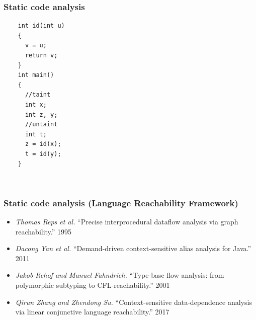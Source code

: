 \documentclass[xcolor=table]{beamer}
\begin{document}
\begin{frame}[fragile] \frametitle{Static code analysis}
  \begin{minipage}[t]{0.45\textwidth}
    \vspace{-7.5cm}
    \lstset{language=C,basicstyle=\small}
    \begin{lstlisting}
    int id(int u)
    {
      v = u;
      return v;
    }
    int main()
    {
      //taint
      int x;
      int z, y;
      //untaint
      int t;
      z = id(x);
      t = id(y);
    }
  \end{lstlisting}
\end{minipage}
~
\begin{minipage}[t]{0.45\textwidth}

\end{minipage}

\end{frame}

\begin{frame}
  \frametitle{Static code analysis (Language Reachability Framework)}
    \begin{itemize}
        \item \emph{Thomas Reps et al.} ``Precise interprocedural dataflow analysis via graph reachability.'' 1995
        \item \emph{Dacong Yan et al.} ``Demand-driven context-sensitive alias analysis for Java.'' 2011
        \item \emph{Jakob Rehof and Manuel Fahndrich.} ``Type-base flow analysis: from polymorphic subtyping to CFL-reachability.'' 2001
        \pause
        \item \emph{Qirun Zhang and Zhendong Su.} ``Context-sensitive data-dependence analysis via linear conjunctive language reachability.'' 2017
    \end{itemize}
  \end{frame}
\end{document}
